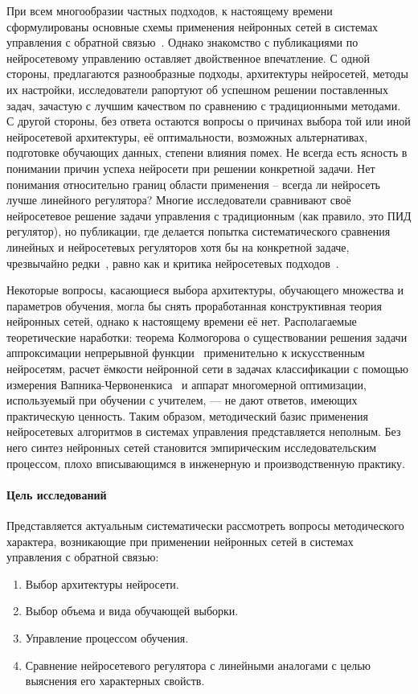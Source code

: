 При всем многообразии частных подходов, к настоящему времени
сформулированы основные схемы применения нейронных сетей в системах
управления с обратной
связью~\cite{narpart92,park96,suykens96,terehov99,sigom00}.  Однако
знакомство с публикациями по нейросетевому управлению оставляет
двойственное впечатление.  С одной стороны, предлагаются разнообразные
подходы, архитектуры нейросетей, методы их настройки, исследователи
рапортуют об успешном решении поставленных задач, зачастую с лучшим
качеством по сравнению с традиционными методами.  С другой стороны,
без ответа остаются вопросы о причинах выбора той или иной
нейросетевой архитектуры, её оптимальности, возможных альтернативах,
подготовке обучающих данных, степени влияния помех.  Не всегда есть
ясность в понимании причин успеха нейросети при решении конкретной
задачи.  Нет понимания относительно границ области применения --
всегда ли нейросеть лучше линейного регулятора?  Многие исследователи
сравнивают своё нейросетевое решение задачи управления с традиционным
(как правило, это ПИД регулятор), но публикации, где делается попытка
систематического сравнения линейных и нейросетевых регуляторов хотя бы
на конкретной задаче, чрезвычайно редки~\cite{khomyu96}, равно как и
критика нейросетевых подходов~\cite{warwick95,warwick96}.


Некоторые вопросы, касающиеся выбора архитектуры, обучающего множества
и параметров обучения, могла бы снять проработанная конструктивная
теория нейронных сетей, однако к настоящему времени её нет.
Располагаемые теоретические наработки: теорема Колмогорова о
существовании решения задачи аппроксимации непрерывной
функции~\cite{kolmog57} применительно к искусственным нейросетям,
расчет ёмкости нейронной сети в задачах классификации с помощью
измерения Вапника-Червоненкиса~\cite{haykin2008} и аппарат многомерной
оптимизации, используемый при обучении с учителем, --- не дают
ответов, имеющих практическую ценность.  Таким образом, методический
базис применения нейросетевых алгоритмов в системах управления
представляется неполным.  Без него синтез нейронных сетей становится
эмпирическим исследовательским процессом, плохо вписывающимся в
инженерную и производственную практику.

\paragraph{Цель исследований}

Представляется актуальным систематически рассмотреть вопросы
методического характера, возникающие при применении нейронных сетей в
системах управления с обратной связью:
\begin{enumerate}
\item Выбор архитектуры нейросети.
\item Выбор объема и вида обучающей выборки.
\item Управление процессом обучения.
\item Сравнение нейросетевого регулятора с линейными аналогами с целью
  выяснения его характерных свойств.
\end{enumerate}

